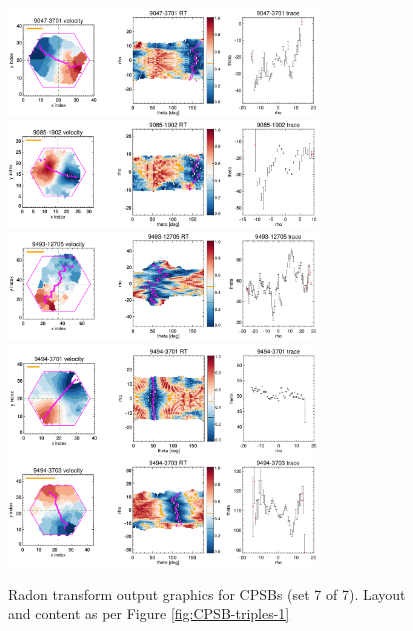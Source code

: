 \documentclass[fleqn,usenatbib]{mnras}
\begin{document}
\begin{figure}
    \centering
    \includegraphics[width=0.73\textwidth]{Images/SN1-MC250/CPSB-triples/CPSB-9047-3701-1-250.png}
    \includegraphics[width=0.73\textwidth]{Images/SN1-MC250/CPSB-triples/CPSB-9085-1902-1-250.png}
    \includegraphics[width=0.73\textwidth]{Images/SN1-MC250/CPSB-triples/CPSB-9493-12705-1-250.png}
    \includegraphics[width=0.73\textwidth]{Images/SN1-MC250/CPSB-triples/CPSB-9494-3701-1-250.png}
    \includegraphics[width=0.73\textwidth]{Images/SN1-MC250/CPSB-triples/CPSB-9494-3703-1-250.png}  
    \caption{Radon transform output graphics for CPSBs (set 7 of 7). Layout and content as per Figure \ref{fig:CPSB-triples-1}}
    \label{fig:CPSB-triples-7}
\end{figure}
\end{document}
